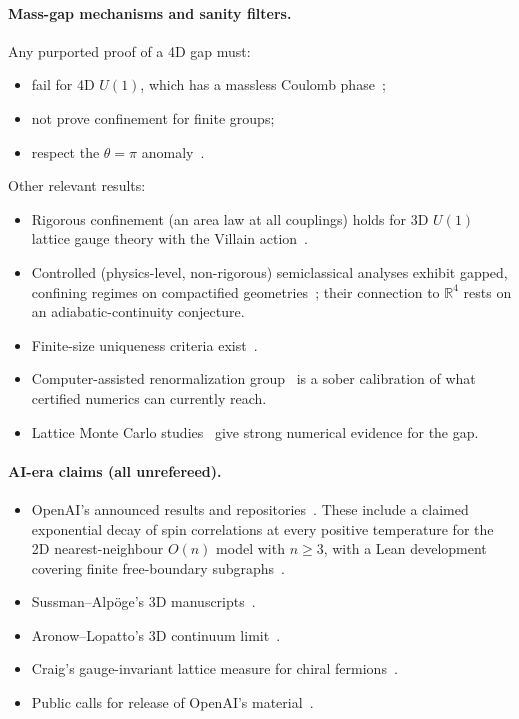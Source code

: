 \documentclass[11pt]{article}
\theoremstyle{definition}
\theoremstyle{remark}
\newcommand{\R}{\mathbb{R}}
\begin{document}
\paragraph{Mass-gap mechanisms and sanity filters.}
Any purported proof of a 4D gap must:
\begin{itemize}[leftmargin=*]
\item fail for 4D $U(1)$, which has a massless Coulomb phase~\cite{Guth1980,Frohlich1982a};
\item not prove confinement for finite groups;
\item respect the $\theta=\pi$ anomaly~\cite{Gaiotto2017}.
\end{itemize}
Other relevant results:
\begin{itemize}[leftmargin=*]
\item Rigorous confinement (an area law at all couplings) holds for 3D $U(1)$ lattice gauge theory
  with the Villain action~\cite{Gopfert1982}.
\item Controlled (physics-level, non-rigorous) semiclassical analyses exhibit gapped, confining
  regimes on compactified geometries~\cite{Tanizaki2022}; their connection to $\R^4$ rests on an
  adiabatic-continuity conjecture.
\item Finite-size uniqueness criteria exist~\cite{Dobrushin1985}.
\item Computer-assisted renormalization group~\cite{Ebel2025} is a sober calibration of what
  certified numerics can currently reach.
\item Lattice Monte Carlo studies~\cite{Morningstar1999,Lucini2013} give strong numerical
  evidence for the gap.
\end{itemize}

\paragraph{AI-era claims (all unrefereed).}
\begin{itemize}[leftmargin=*]
\item OpenAI's announced results and repositories~\cite{OpenAI2026j,OpenAI2026m,OpenAI2026n}.
  These include a claimed exponential decay of spin correlations at every positive temperature for
  the 2D nearest-neighbour $O(n)$ model with $n\ge3$, with a Lean development covering finite
  free-boundary subgraphs~\cite{OpenAI2026b}.
\item Sussman--Alp\"oge's 3D manuscripts~\cite{Sussman2026}.
\item Aronow--Lopatto's 3D continuum limit~\cite{Aronow2026}.
\item Craig's gauge-invariant lattice measure for chiral fermions~\cite{Craig2026a}.
\item Public calls for release of OpenAI's material~\cite{AGMAI2026}.
\end{itemize}
\end{document}
